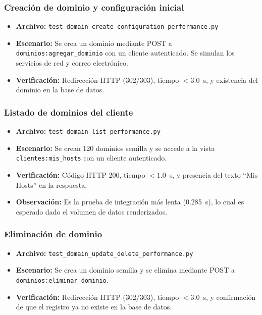 \documentclass[12pt,a4paper]{article}
\begin{document}
\subsubsection{Creación de dominio y configuración inicial}

\begin{itemize}
  \item \textbf{Archivo:} \texttt{test\_domain\_create\_configuration\_performance.py}
  \item \textbf{Escenario:} Se crea un dominio mediante POST a \texttt{dominios:agregar\_dominio}
        con un cliente autenticado. Se simulan los servicios de red y correo electrónico.
  \item \textbf{Verificación:} Redirección HTTP (302/303), tiempo $< 3.0$~s, y existencia
        del dominio en la base de datos.
\end{itemize}

\subsubsection{Listado de dominios del cliente}

\begin{itemize}
  \item \textbf{Archivo:} \texttt{test\_domain\_list\_performance.py}
  \item \textbf{Escenario:} Se crean 120 dominios semilla y se accede a la vista
        \texttt{clientes:mis\_hosts} con un cliente autenticado.
  \item \textbf{Verificación:} Código HTTP 200, tiempo $< 1.0$~s, y presencia del texto
        ``Mis Hosts'' en la respuesta.
  \item \textbf{Observación:} Es la prueba de integración más lenta (0.285~s), lo cual es
        esperado dado el volumen de datos renderizados.
\end{itemize}

\subsubsection{Eliminación de dominio}

\begin{itemize}
  \item \textbf{Archivo:} \texttt{test\_domain\_update\_delete\_performance.py}
  \item \textbf{Escenario:} Se crea un dominio semilla y se elimina mediante POST a
        \texttt{dominios:eliminar\_dominio}.
  \item \textbf{Verificación:} Redirección HTTP (302/303), tiempo $< 3.0$~s, y confirmación
        de que el registro ya no existe en la base de datos.
\end{itemize}
\end{document}

